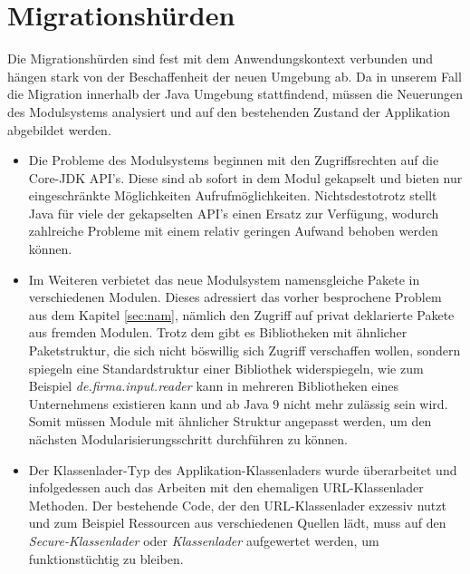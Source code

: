 \section{Migrationshürden} \label{MigH}

	Die Migrationshürden sind fest mit dem Anwendungskontext verbunden und hängen stark von der Beschaffenheit der neuen Umgebung ab. Da in unserem Fall die Migration innerhalb der Java Umgebung stattfindend, müssen die Neuerungen des Modulsystems analysiert und auf den bestehenden Zustand der Applikation abgebildet werden.\bigbreak

\begin{itemize}
	\item Die Probleme des Modulsystems beginnen mit den Zugriffsrechten auf die Core-JDK API's. Diese sind ab sofort in dem Modul gekapselt und bieten nur eingeschränkte Möglichkeiten Aufrufmöglichkeiten. Nichtsdestotrotz stellt Java für viele der gekapselten API's einen Ersatz zur Verfügung, wodurch zahlreiche Probleme mit einem relativ geringen Aufwand behoben werden können. \cite{masteringJava9,modulProgJava9,modulMitJava9,javaMod9} 


	\item Im Weiteren verbietet das neue Modulsystem namensgleiche Pakete in verschiedenen Modulen. Dieses adressiert das vorher besprochene Problem aus dem Kapitel \ref{sec:nam}, nämlich den Zugriff auf privat deklarierte Pakete aus fremden Modulen. Trotz dem gibt es Bibliotheken mit ähnlicher Paketstruktur, die sich nicht böswillig sich Zugriff verschaffen wollen, sondern spiegeln eine Standardstruktur einer Bibliothek widerspiegeln, wie zum Beispiel \textit{de.firma.input.reader} kann in mehreren Bibliotheken eines Unternehmens existieren kann und ab Java 9 nicht mehr zulässig sein wird. Somit müssen Module mit ähnlicher Struktur angepasst werden, um den nächsten Modularisierungsschritt durchführen zu können. \cite{masteringJava9,modulProgJava9,modulMitJava9,javaMod9} 


	\item Der Klassenlader-Typ des Applikation-Klassenladers wurde überarbeitet und infolgedessen auch das Arbeiten mit den ehemaligen URL-Klassenlader Methoden. Der bestehende Code, der den URL-Klassenlader exzessiv nutzt und zum Beispiel Ressourcen aus verschiedenen Quellen lädt, muss auf den \textit{Secure-Klassenlader} oder  \textit{Klassenlader} aufgewertet werden, um funktionstüchtig zu bleiben. \cite{oracModClassLoader,jecan2017java} 



\end{itemize}
